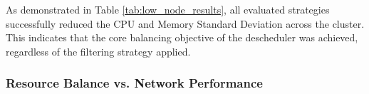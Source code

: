 \begin{table}[tbp]
    \centering
    \caption{Descheduler Performance: LowNodeUtilization Scenario (MinBetterPercentage=75\%)}
    \label{tab:low_node_results}
\end{table}

As demonstrated in Table \ref{tab:low_node_results}, all evaluated strategies successfully reduced the CPU and Memory Standard Deviation across the cluster. This indicates that the core balancing objective of the descheduler was achieved, regardless of the filtering strategy applied.


\subsubsection{Resource Balance vs. Network Performance}
\label{subsubsec:netaware4_resultanalysis1_tradeoff}

